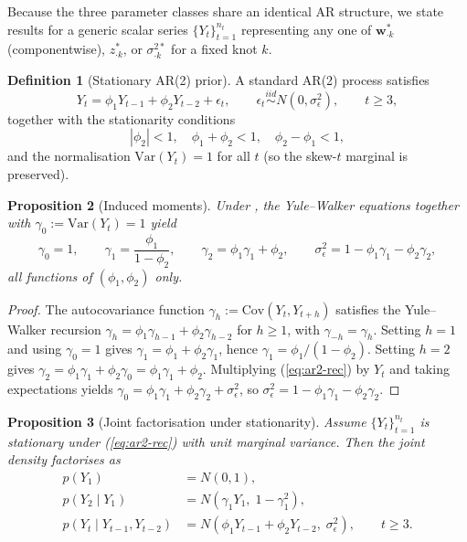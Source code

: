\documentclass[11pt]{article}
\newcommand{\bw}{\mathbf{w}}
\newcommand{\skewt}{skew-$t$\xspace}
\newcommand{\eref}[1]{(\ref{#1})}
\theoremstyle{plain}
\newtheorem{proposition}{Proposition}[section]
\theoremstyle{definition}
\newtheorem{definition}[proposition]{Definition}
\theoremstyle{remark}
\begin{document}
Because the three parameter classes share an identical AR structure, we
state results for a generic scalar series $\{Y_t\}_{t=1}^{n_t}$ representing
any one of $\bw^{*}_{\cdot k}$ (componentwise), $z^{*}_{\cdot k}$, or
$\sigma^{2*}_{\cdot k}$ for a fixed knot $k$.

\begin{definition}[Stationary AR(2) prior]\label{def:ar2}
A standard AR(2) process satisfies
\begin{equation}\label{eq:ar2-rec}
  Y_t = \phi_1 Y_{t-1} + \phi_2 Y_{t-2} + \epsilon_t,
  \qquad \epsilon_t \stackrel{iid}{\sim} N(0, \sigma_\epsilon^2),
  \qquad t \geq 3,
\end{equation}
together with the stationarity conditions
\begin{equation}\label{eq:ar2-stab}
  |\phi_2| < 1, \quad \phi_1 + \phi_2 < 1, \quad \phi_2 - \phi_1 < 1,
\end{equation}
and the normalisation $\mathrm{Var}(Y_t) = 1$ for all $t$ (so the \skewt
marginal is preserved).
\end{definition}

\begin{proposition}[Induced moments]\label{prop:moments}
Under , the Yule--Walker equations together with
$\gamma_0 := \mathrm{Var}(Y_t) = 1$ yield
\begin{equation}\label{eq:moments}
  \gamma_0 = 1, \qquad
  \gamma_1 = \frac{\phi_1}{1 - \phi_2}, \qquad
  \gamma_2 = \phi_1 \gamma_1 + \phi_2, \qquad
  \sigma_\epsilon^2 = 1 - \phi_1 \gamma_1 - \phi_2 \gamma_2,
\end{equation}
all functions of $(\phi_1, \phi_2)$ only.
\end{proposition}

\begin{proof}
The autocovariance function $\gamma_h := \mathrm{Cov}(Y_t, Y_{t+h})$
satisfies the Yule--Walker recursion $\gamma_h = \phi_1 \gamma_{h-1}
+ \phi_2 \gamma_{h-2}$ for $h \geq 1$, with $\gamma_{-h} = \gamma_h$. Setting
$h = 1$ and using $\gamma_0 = 1$ gives $\gamma_1 = \phi_1 + \phi_2 \gamma_1$,
hence $\gamma_1 = \phi_1 / (1 - \phi_2)$. Setting $h = 2$ gives
$\gamma_2 = \phi_1 \gamma_1 + \phi_2 \gamma_0 = \phi_1 \gamma_1 + \phi_2$.
Multiplying \eref{eq:ar2-rec} by $Y_t$ and taking expectations yields
$\gamma_0 = \phi_1 \gamma_1 + \phi_2 \gamma_2 + \sigma_\epsilon^2$,
so $\sigma_\epsilon^2 = 1 - \phi_1 \gamma_1 - \phi_2 \gamma_2$.
\end{proof}

\begin{proposition}[Joint factorisation under stationarity]\label{prop:factor}
Assume $\{Y_t\}_{t=1}^{n_t}$ is stationary under \eref{eq:ar2-rec} with
unit marginal variance. Then the joint density factorises as
\begin{align}
  p(Y_1) &= N(0, 1), \label{eq:p1} \\
  p(Y_2 \mid Y_1) &= N\!\left(\gamma_1 Y_1,\; 1 - \gamma_1^2\right), \label{eq:p2} \\
  p(Y_t \mid Y_{t-1}, Y_{t-2}) &= N\!\left(\phi_1 Y_{t-1} + \phi_2 Y_{t-2},\; \sigma_\epsilon^2\right),
  \qquad t \geq 3. \label{eq:pt}
\end{align}
\end{proposition}
\end{document}
